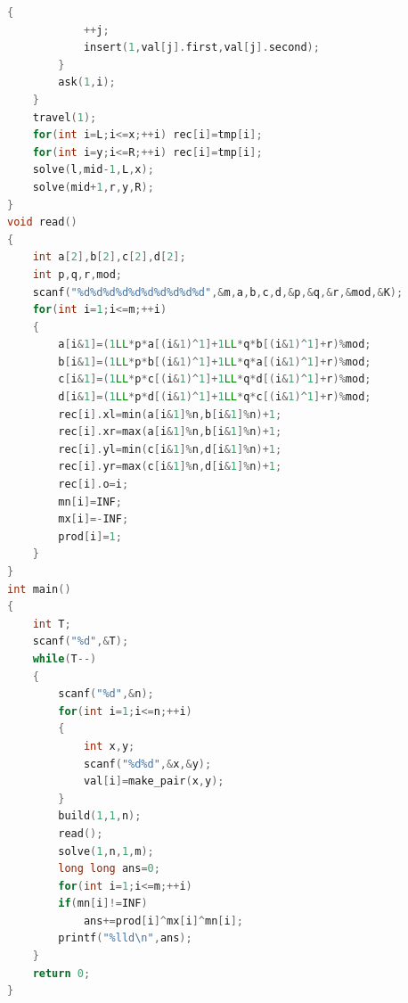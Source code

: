 \documentclass[UTF8,a4paper,titlepage]{ctexart}
\begin{document}
\begin{lstlisting}[language=C++]
        {
            ++j;
            insert(1,val[j].first,val[j].second);
        }
        ask(1,i);
    }
    travel(1);
    for(int i=L;i<=x;++i) rec[i]=tmp[i];
    for(int i=y;i<=R;++i) rec[i]=tmp[i];
    solve(l,mid-1,L,x);
    solve(mid+1,r,y,R);
}
void read()
{
    int a[2],b[2],c[2],d[2];
    int p,q,r,mod;
    scanf("%d%d%d%d%d%d%d%d%d%d",&m,a,b,c,d,&p,&q,&r,&mod,&K);
    for(int i=1;i<=m;++i)
    {
        a[i&1]=(1LL*p*a[(i&1)^1]+1LL*q*b[(i&1)^1]+r)%mod;
        b[i&1]=(1LL*p*b[(i&1)^1]+1LL*q*a[(i&1)^1]+r)%mod;
        c[i&1]=(1LL*p*c[(i&1)^1]+1LL*q*d[(i&1)^1]+r)%mod;
        d[i&1]=(1LL*p*d[(i&1)^1]+1LL*q*c[(i&1)^1]+r)%mod;
        rec[i].xl=min(a[i&1]%n,b[i&1]%n)+1;
        rec[i].xr=max(a[i&1]%n,b[i&1]%n)+1;
        rec[i].yl=min(c[i&1]%n,d[i&1]%n)+1;
        rec[i].yr=max(c[i&1]%n,d[i&1]%n)+1;
        rec[i].o=i;
        mn[i]=INF;
        mx[i]=-INF;
        prod[i]=1;
    }
}
int main()
{
    int T;
    scanf("%d",&T);
    while(T--)
    {
        scanf("%d",&n);
        for(int i=1;i<=n;++i)
        {
            int x,y;
            scanf("%d%d",&x,&y);
            val[i]=make_pair(x,y);
        }
        build(1,1,n);
        read();
        solve(1,n,1,m);
        long long ans=0;
        for(int i=1;i<=m;++i)
        if(mn[i]!=INF)
            ans+=prod[i]^mx[i]^mn[i];
        printf("%lld\n",ans);
    }
    return 0;
}
\end{lstlisting}
\end{document}
